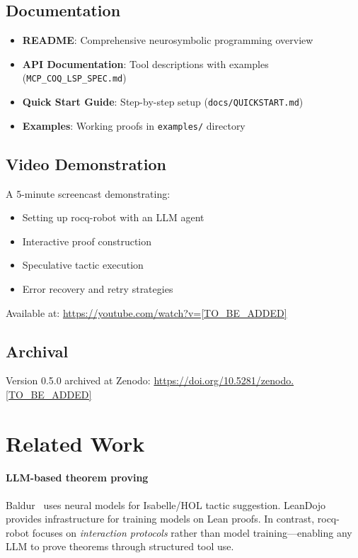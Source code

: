 \documentclass[sigconf,screen,nonacm]{acmart}
\begin{document}
\subsection{Documentation}

\begin{itemize}
\item \textbf{README}: Comprehensive neurosymbolic programming overview
\item \textbf{API Documentation}: Tool descriptions with examples (\texttt{MCP\_COQ\_LSP\_SPEC.md})
\item \textbf{Quick Start Guide}: Step-by-step setup (\texttt{docs/QUICKSTART.md})
\item \textbf{Examples}: Working proofs in \texttt{examples/} directory
\end{itemize}

\subsection{Video Demonstration}

A 5-minute screencast demonstrating:
\begin{itemize}
\item Setting up rocq-robot with an LLM agent
\item Interactive proof construction
\item Speculative tactic execution
\item Error recovery and retry strategies
\end{itemize}

Available at: \url{https://youtube.com/watch?v=[TO_BE_ADDED]}

\subsection{Archival}

Version 0.5.0 archived at Zenodo: \url{https://doi.org/10.5281/zenodo.[TO_BE_ADDED]}

\section{Related Work}

\paragraph{LLM-based theorem proving}
Baldur~\cite{first2023baldur} uses neural models for Isabelle/HOL tactic suggestion. LeanDojo~\cite{yang2023leandojo} provides infrastructure for training models on Lean proofs. In contrast, rocq-robot focuses on \emph{interaction protocols} rather than model training—enabling any LLM to prove theorems through structured tool use.
\end{document}
